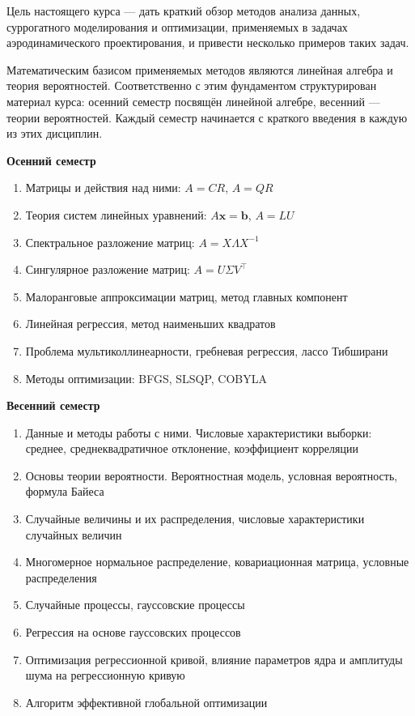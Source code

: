 \documentclass[11pt,a4paper]{article}
\providecommand{\tightlist}{%
      \setlength{\itemsep}{0pt}\setlength{\parskip}{0pt}}
\begin{document}
Цель настоящего курса --- дать краткий обзор методов анализа данных,
суррогатного моделирования и оптимизации, применяемых в задачах
аэродинамического проектирования, и привести несколько примеров таких
задач.

Математическим базисом применяемых методов являются линейная алгебра и
теория вероятностей. Соответственно с этим фундаментом структурирован
материал курса: осенний семестр посвящён линейной алгебре, весенний ---
теории вероятностей. Каждый семестр начинается с краткого введения в
каждую из этих дисциплин.

\textbf{Осенний семестр}

\begin{enumerate}
\def\labelenumi{\arabic{enumi}.}
\tightlist
\item
  Матрицы и действия над ними: \(A=CR\), \(A=QR\)
\item
  Теория систем линейных уравнений: \(A\mathbf{x} = \mathbf{b}\),
  \(A=LU\)
\item
  Спектральное разложение матриц: \(A = X \Lambda X^{-1}\)
\item
  Сингулярное разложение матриц: \(A = U \Sigma V^\top\)
\item
  Малоранговые аппроксимации матриц, метод главных компонент
\item
  Линейная регрессия, метод наименьших квадратов
\item
  Проблема мультиколлинеарности, гребневая регрессия, лассо Тибширани
\item
  Методы оптимизации: BFGS, SLSQP, COBYLA
\end{enumerate}

\textbf{Весенний семестр}

\begin{enumerate}
\def\labelenumi{\arabic{enumi}.}
\tightlist
\item
  Данные и методы работы с ними. Числовые характеристики выборки:
  среднее, среднеквадратичное отклонение, коэффициент корреляции
\item
  Основы теории вероятности. Вероятностная модель, условная вероятность,
  формула Байеса
\item
  Случайные величины и их распределения, числовые характеристики
  случайных величин
\item
  Многомерное нормальное распределение, ковариационная матрица, условные
  распределения
\item
  Случайные процессы, гауссовские процессы
\item
  Регрессия на основе гауссовских процессов
\item
  Оптимизация регрессионной кривой, влияние параметров ядра и амплитуды
  шума на регрессионную кривую
\item
  Алгоритм эффективной глобальной оптимизации
\end{enumerate}
\end{document}
